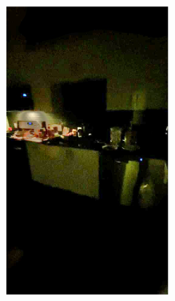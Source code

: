 \documentclass[letterpaper,12pt]{article}
\begin{document}
\begin{figure}[htbp]
\begin{subfigure}{0.128\textwidth}
			\includegraphics[width=\linewidth]{LoLi-Phone-imgT/ExCNet}
			\captionsetup{font=scriptsize}
			\caption{}
			\label{fig: LoLi-Phone-imgT_l}
		\end{subfigure}
		\begin{subfigure}{0.128\textwidth}

\end{subfigure}
\end{figure}
\end{document}
